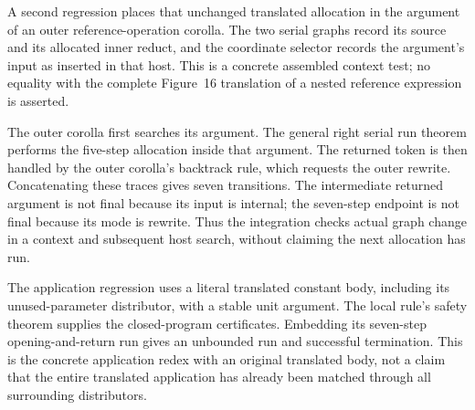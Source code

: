 



A second regression places that unchanged translated allocation in
the argument of an outer reference-operation corolla. The two serial graphs
record its source and its allocated inner reduct, and the coordinate selector
records the argument's input as inserted in that host. This is a concrete
assembled context test; no equality with the complete Figure~16 translation
of a nested reference expression is asserted.





The outer corolla first searches its argument. The general right
serial run theorem performs the five-step allocation inside that argument.
The returned token is then handled by the outer corolla's backtrack rule,
which requests the outer rewrite. Concatenating these traces gives seven
transitions. The intermediate returned argument is not final because its
input is internal; the seven-step endpoint is not final because its mode
is rewrite. Thus the integration checks actual graph change in a context
and subsequent host search, without claiming the next allocation has run.






The application regression uses a literal translated constant body,
including its unused-parameter distributor, with a stable unit argument.
The local rule's safety theorem supplies the closed-program certificates.
Embedding its seven-step opening-and-return run gives an unbounded run
and successful termination. This is the concrete application redex with an
original translated body, not a claim that the entire translated application
has already been matched through all surrounding distributors.


